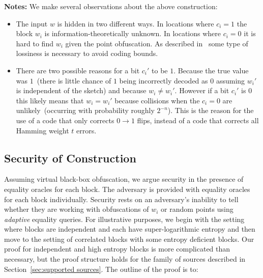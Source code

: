 \documentclass[11pt]{article}
\newcommand{\secref}[1]{\mbox{Section~\ref{#1}}}
\begin{document}
\textbf{Notes:}  We make several observations about the above construction:
\begin{itemize}
\item The input $w$ is hidden in two different ways.  In locations where $c_i=1$ the block $w_i$ is information-theoretically unknown.
In locations where $c_i=0$ it is hard to find $w_i$ given the point obfuscation.  As described in~\cite[Section 3.3]{fuller2013computational} some type of lossiness is necessary to avoid coding bounds.
\item There are two possible reasons for a bit $c_i'$ to be $1$.  Because the true value was $1$~(there is little chance of $1$ being incorrectly decoded as $0$ assuming $w_i'$ is independent of the sketch) and because $w_i \neq w_i'$.  However if a bit $c_i'$ is $0$ this likely means that $w_i=w_i'$ because collisions when the $c_i=0$ are unlikely~(occurring with probability roughly $2^{-n}$).  This is the reason for the use of a code that only corrects $0\rightarrow 1$ flips, instead of a code that corrects all Hamming weight $t$ errors.
\end{itemize}

\subsection{Security of Construction}
\label{sec:sec of construction}
Assuming virtual black-box obfuscation, we argue security in the presence of equality oracles for each block.  The adversary is provided with equality oracles for each block individually.  Security rests on an adversary's inability to tell whether they are working with obfuscations of $w_i$ or random points using \emph{adaptive} equality queries.  For illustrative purposes, we begin with the setting where blocks are independent and each have super-logarithmic entropy and then move to the setting of correlated blocks with some entropy deficient blocks.  Our proof for independent and high entropy blocks is more complicated than necessary, but the proof structure holds for the family of sources described in \secref{sec:supported sources}.  The outline of the proof is to:
\end{document}

